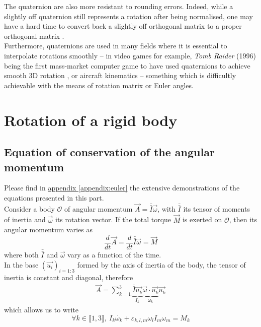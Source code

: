 \documentclass[class=report, float=false, crop=false]{standalone}
\begin{document}
The quaternion are also more resistant to rounding errors. Indeed, while a slightly off quaternion still represents a rotation after being normalised, one may have a hard time to convert back a slightly off orthogonal matrix to a proper orthogonal matrix \cite{wiki:quaternions}.\\

Furthermore, quaternions are used in many fields where it is essential to interpolate rotations smoothly -- in video games for example, \textit{Tomb Raider} (1996) being the first mass-market computer game to have used quaternions to achieve smooth 3D rotation \cite{bobick1998rotating}, or aircraft kinematics \cite{phillips2001review} -- something which is difficultly achievable with the means of rotation matrix or Euler angles.

\section{Rotation of a rigid body}

\subsection{Equation of conservation of the angular momentum}

Please find in \hyperref[appendix:euler]{appendix \ref{appendix:euler}} the extensive demonstrations of the equations presented in this part.\\

Consider a body $\mathcal{O}$ of angular momentum $\vec{A} = \bar{\bar{I}}\vec{\omega}$, with $\bar{\bar{I}}$ its tensor of moments of inertia and $\vec{\omega}$ its rotation vector. If the total torque $\vec{M}$ is exerted on $\mathcal{O}$, then its angular momentum varies as
\begin{equation}
\boxed{\frac{d}{dt}\vec{A} = \frac{d}{dt}\bar{\bar{I}}\vec{\omega} = \vec{M}}
\label{TMC_}
\end{equation}
where both $\bar{\bar{I}}$ and $\vec{\omega}$ vary as a function of the time.\\

In the base $(\vec{u_i})_{i=1:3}$ formed by the axis of inertia of the body, the tensor of inertia is constant and diagonal, therefore
\begin{align*}
\vec{A} = \sum_{k=1}^3 \underbrace{\bar{\bar{I}}\vec{u_k}}_{I_k} \underbrace{\vec{\omega}\cdot\vec{u_k}}_{\omega_k} \vec{u_k}
\end{align*}
which allows us to write
\begin{equation}
\boxed{\forall k \in \llbracket1,3\rrbracket,~ I_k \dot{\omega_k} + \varepsilon_{k,l,m}\omega_lI_m\omega_m = M_k}
\label{euler_rot_}
\end{equation}
\end{document}
